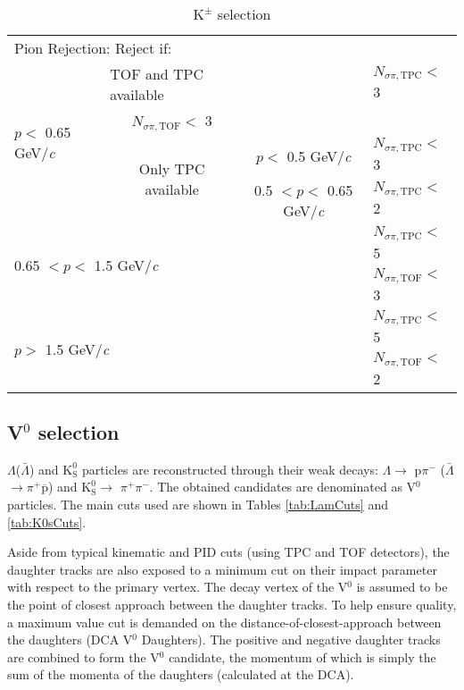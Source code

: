 \documentclass[ALICE,manyauthors]{cernphprep}
\newcommand{\Lam}{$\Lambda$\xspace}
\newcommand{\ALam}{$\bar{\Lambda}$\xspace}
\newcommand{\LamALam}{$\Lambda$($\bar{\Lambda}$)\xspace}
\newcommand{\Kpm}{$\mathrm{K^{\pm}}$\xspace}
\newcommand{\Ks}{$\mathrm{K^{0}_{S}}$\xspace}
\newcommand{\Vz}{V$^{0}$\xspace}
\begin{document}
\begin{table}[htbp]
\begin{tabular}{lc|c|l}
   \multicolumn{4}{l}{Pion Rejection:  Reject if:} \\
   \multirow{4}{*}{$p <$ 0.65 GeV/\textit{c}} & \multicolumn{1}{l}{TOF and TPC available} & \multicolumn{1}{c|}{} & $N_{\sigma \pi,\mathrm{TPC}} <$ 3 \\
   \multicolumn{3}{c|}{} & $N_{\sigma \pi,\mathrm{TOF}} <$ 3 \\
   \cline{2-4}
    & \multirow{2}{*}{Only TPC available} & $p <$ 0.5 GeV/\textit{c} & $N_{\sigma \pi,\mathrm{TPC}} <$ 3 \\
   \cline{3-4}
    &  & 0.5 $< p <$ 0.65 GeV/\textit{c} & $N_{\sigma \pi,\mathrm{TPC}} <$ 2 \\
   \cline{2-4}
   \multicolumn{3}{l|}{\multirow{2}{*}{0.65 $< p <$ 1.5 GeV/\textit{c}}} & $N_{\sigma \pi,\mathrm{TPC}} <$ 5 \\
    & \multicolumn{2}{c|}{} & $N_{\sigma \pi,\mathrm{TOF}} <$ 3 \\
   \cline{2-4}
   \multicolumn{3}{l|}{\multirow{2}{*}{$p >$ 1.5 GeV/\textit{c}}} & $N_{\sigma \pi,\mathrm{TPC}} <$ 5 \\
    & \multicolumn{2}{c|}{} & $N_{\sigma \pi,\mathrm{TOF}} <$ 2 \\
   \hline
  \end{tabular}
 \caption{\Kpm selection}
 \label{tab:KchCuts} 
\end{table}


\subsection{\Vz selection}
\label{sec:V0Selection}

\LamALam and \Ks particles are reconstructed through their weak decays: \Lam $\rightarrow$ p$\pi^{-}$ (\ALam $\rightarrow \pi^{+}\overline{\mathrm{p}}$) and \Ks $\rightarrow$ $\pi^{+}\pi^{-}$.
The obtained candidates are denominated as \Vz particles.
The main cuts used are shown in Tables \ref{tab:LamCuts} and \ref{tab:K0sCuts}.

Aside from typical kinematic and PID cuts (using TPC and TOF detectors), the daughter tracks are also exposed to a minimum cut on their impact parameter with respect to the primary vertex.  
The decay vertex of the \Vz is assumed to be the point of closest approach between the daughter tracks.
To help ensure quality, a maximum value cut is demanded on the distance-of-closest-approach between the daughters (DCA \Vz Daughters).
The positive and negative daughter tracks are combined to form the \Vz candidate, the momentum of which is simply the sum of the momenta of the daughters (calculated at the DCA).
\end{document}

